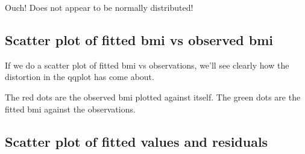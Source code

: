 \documentclass[titlepage]{book}\usepackage{knitr}
\begin{document}
\begin{knitrout}
\color{fgcolor}
\end{knitrout}
Ouch! Does not appear to be normally distributed!

\subsection{Scatter plot of fitted bmi vs observed bmi}

If we do a scatter plot of fitted  bmi vs observations, we'll see clearly how the distortion in the qqplot has come about.

\begin{knitrout}
\color{fgcolor}\begin{kframe}
\begin{alltt}
 \hlopt{+} \hlstd{(}\hlstd{(}     \hlstd{=} \hlstd{)} \hlopt{+}
  \hlstd{(}\hlstd{(}     \hlstd{=} \hlstd{,}  \hlstd{=} \hlstd{)}
\end{alltt}
\end{kframe}
\end{knitrout}

The red dots are the observed bmi plotted against itself.  The green dots are the fitted bmi against the observations.

\subsection{Scatter plot of fitted values and residuals}

\begin{knitrout}
\color{fgcolor}\begin{kframe}
\begin{alltt}
 \hlkwb{<-}  \hlstd{(}   \hlopt{+}
  \hlstd{(} \hlstd{=} \hlstd{,}  \hlstd{=} \hlstd{)}
\end{alltt}
\end{kframe}
\end{knitrout}
\end{document}
